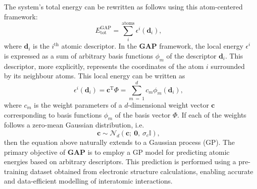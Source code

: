 The system's total energy can be rewritten as follows using this atom-centered framework:
\begin{equation}
    \label{equ:2.48}
     E^{\text{GAP}}_{\text{tot}} = \sum^{\text{atoms}}_{i}\epsilon^{i}(\textbf{d}_{i}),
\end{equation}
where $\textbf{d}_{i}$ is the $i^{\text{th}}$ atomic descriptor.
In the \textbf{GAP} framework, the local energy $\epsilon^{i}$ is expressed as a sum of arbitrary basis functions $\phi_{m}$ of the descriptor $\textbf{d}_{i}$.
This descriptor, more explicitly, represents the coordinates of the atom $i$ surrounded by its neighbour atoms. 
This local energy can be written as
\begin{equation}
    \label{equ:2.49}
     \epsilon^{i}(\textbf{d}_{i})= \textbf{c}^{\text{T}}\Phi = \sum_{m\:=\:1}^{d}c_{m}\phi_{m}(\textbf{d}_{i}),
\end{equation}
where $c_{m}$ is the weight parameters of a $d$-dimensional weight vector $\textbf{c}$ corresponding to basis functions $\phi_{m}$ of the basis vector $\Phi$. 
If each of the weights follows a zero-mean Gaussian distribution, i.e. 
\[\textbf{c}\sim\mathcal{N}_{d}(\textbf{c};\:\textbf{0},\:\sigma_{c}\mathbb{I}),\]
then the equation above naturally extends to a Gaussian process (GP).
The primary objective of \textbf{GAP} is to employ a GP model for predicting atomic energies based on arbitrary descriptors. 
This prediction is performed using a pre-training dataset obtained from electronic structure calculations, enabling accurate and data-efficient modelling of interatomic interactions.

